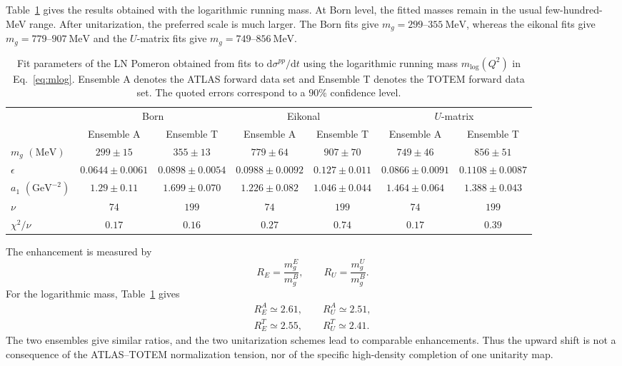\documentclass[aps,prd,twocolumn,superscriptaddress,longbibliography,nofootinbib]{revtex4-2}
\newcommand{\GeV}{\mathrm{GeV}}
\newcommand{\MeV}{\mathrm{MeV}}
\newcommand{\dd}{\mathrm{d}}
\begin{document}
Table~\ref{tab:log_results} gives the results obtained with the
logarithmic running mass. At Born level, the fitted masses remain in the
usual few-hundred-MeV range. After unitarization, the preferred scale is
much larger. The Born fits give $m_g=299$--$355~\MeV$, whereas the
eikonal fits give $m_g=779$--$907~\MeV$ and the $U$-matrix fits give
$m_g=749$--$856~\MeV$.

\begin{table}
\centering
\caption{Fit parameters of the LN Pomeron obtained from fits to
$\dd\sigma^{pp}/\dd t$ using the logarithmic running mass
$m_{\log}(Q^2)$ in Eq.~\eqref{eq:mlog}. Ensemble A denotes the ATLAS
forward data set and Ensemble T denotes the TOTEM forward data set.
The quoted errors correspond to a $90\%$ confidence level.}
\begin{ruledtabular}
\begin{tabular}{lcccccc}
 & \multicolumn{2}{c}{Born}
 & \multicolumn{2}{c}{Eikonal}
 & \multicolumn{2}{c}{$U$-matrix}\\
\cline{2-3}\cline{4-5}\cline{6-7}
 & Ensemble A & Ensemble T
 & Ensemble A & Ensemble T
 & Ensemble A & Ensemble T \\
\hline
$m_g$ $(\MeV)$
& $299\pm15$ & $355\pm13$
& $779\pm64$ & $907\pm70$
& $749\pm46$ & $856\pm51$ \\
$\epsilon$
& $0.0644\pm0.0061$ & $0.0898\pm0.0054$
& $0.0988\pm0.0092$ & $0.127\pm0.011$
& $0.0866\pm0.0091$ & $0.1108\pm0.0087$ \\
$a_1$ $(\GeV^{-2})$
& $1.29\pm0.11$ & $1.699\pm0.070$
& $1.226\pm0.082$ & $1.046\pm0.044$
& $1.464\pm0.064$ & $1.388\pm0.043$ \\
\hline
$\nu$
& $74$ & $199$ & $74$ & $199$ & $74$ & $199$ \\
$\chi^2/\nu$
& $0.17$ & $0.16$ & $0.27$ & $0.74$ & $0.17$ & $0.39$ \\
\end{tabular}
\end{ruledtabular}
\label{tab:log_results}
\end{table}

The enhancement is measured by
\begin{equation}
R_E=\frac{m_g^E}{m_g^B},
\qquad
R_U=\frac{m_g^U}{m_g^B}.
\label{eq:enhancement_ratios}
\end{equation}
For the logarithmic mass, Table~\ref{tab:log_results} gives
\begin{eqnarray}
R_E^A\simeq 2.61,
\qquad
R_U^A\simeq 2.51,\\
R_E^T\simeq 2.55,
\qquad
R_U^T\simeq 2.41.
\end{eqnarray}
The two ensembles give similar ratios, and the two unitarization schemes
lead to comparable enhancements. Thus the upward shift is not a
consequence of the ATLAS--TOTEM normalization tension, nor of the
specific high-density completion of one unitarity map.
\end{document}
